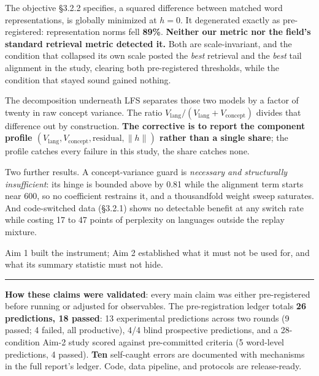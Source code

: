 \documentclass[11pt,a4paper]{article}
\begin{document}
The objective \S3.2.2 specifies, a squared difference between matched word
representations, is globally minimized at $h=0$. It degenerated exactly as
pre-registered: representation norms fell \textbf{89\%}. \textbf{Neither our
metric nor the field's standard retrieval metric detected it.} Both are
scale-invariant, and the condition that collapsed its own scale posted the \emph{best}
retrieval and the \emph{best} tail alignment in the study, clearing both
pre-registered thresholds, while the condition that stayed sound gained nothing.

The decomposition underneath LFS separates those two models by a factor of
twenty in raw concept variance. The ratio
$V_{\text{lang}}/(V_{\text{lang}}+V_{\text{concept}})$ divides that difference
out by construction. \textbf{The corrective is to report the component profile
$(V_{\text{lang}}, V_{\text{concept}}, \text{residual}, \lVert h\rVert)$
rather than a single share}; the profile catches every failure in this
study, the share catches none.

Two further results. A concept-variance guard is \emph{necessary and
structurally insufficient}: its hinge is bounded above by 0.81 while the
alignment term starts near 600, so no coefficient restrains it, and a
thousandfold weight sweep saturates. And code-switched data (\S3.2.1) shows no
detectable benefit at any switch rate while costing 17 to 47 points of
perplexity on languages outside the replay mixture.

Aim 1 built the instrument; Aim 2 established what it must not be used for,
and what its summary statistic must not hide.

\vspace{1mm}\hrule\vspace{2mm}
{\small \textbf{How these claims were validated}: every main claim was either
pre-registered before running or adjusted for observables. The
pre-registration ledger totals \textbf{26 predictions, 18 passed}: 13
experimental predictions across two rounds (9 passed; 4 failed, all
productive), 4/4 blind prospective predictions, and a 28-condition Aim-2 study
scored against pre-committed criteria (5 word-level predictions, 4 passed).
\textbf{Ten} self-caught errors are documented
with mechanisms in the full report's ledger. Code, data pipeline, and
protocols are release-ready.}
\end{document}
